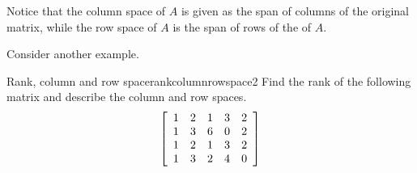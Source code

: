 Notice that the column space of $A$ is given as the span of columns of the original matrix, while the row space of $A$ is the span of rows of the {\rref} of $A$. 

Consider another example.

\begin{example}{Rank, column and row space}{rankcolumnrowspace2}
Find the rank of the following matrix and describe the
column and row spaces.
\begin{equation*}
\left[
\begin{array}{rrrrrr}
1 & 2 & 1 & 3 & 2 \\
1 & 3 & 6 & 0 & 2 \\
1 & 2 & 1 & 3 & 2 \\
1 & 3 & 2 & 4 & 0
\end{array}
\right]
\end{equation*}
\end{example}

